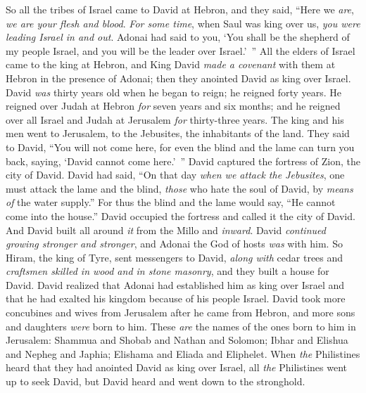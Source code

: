 \begin{biblechapter} %
 So all the tribes of Israel came to David at Hebron, and they said, “Here we \textit{are}, \textit{we are your flesh and blood}.
\verse \textit{For some time}, when Saul was king over us, \textit{you were leading Israel in and out}. Adonai had said to you, ‘You shall be the shepherd of my people Israel, and you will be the leader over Israel.’ ”
\verse All the elders of Israel came to the king at Hebron, and King David \textit{made a covenant} with them at Hebron in the presence of Adonai; then they anointed David as king over Israel.
\verse David \textit{was} thirty years old when he began to reign; he reigned forty years.
\verse He reigned over Judah at Hebron \textit{for} seven years and six months; and he reigned over all Israel and Judah at Jerusalem \textit{for} thirty-three years.
 The king and his men went to Jerusalem, to the Jebusites, the inhabitants of the land. They said to David, “You will not come here, for even the blind and the lame can turn you back, saying, ‘David cannot come here.’ ”
\verse David captured the fortress of Zion, the city of David.
\verse David had said, “On that day \textit{when we attack the Jebusites}, one must attack the lame and the blind, \textit{those} who hate the soul of David, by \textit{means of} the water supply.” For thus the blind and the lame would say, “He cannot come into the house.”
\verse David occupied the fortress and called it the city of David. And David built all around \textit{it} from the Millo and \textit{inward}.
\verse David \textit{continued growing stronger and stronger}, and Adonai the God of hosts \textit{was} with him.
\verse So Hiram, the king of Tyre, sent messengers to David, \textit{along with} cedar trees and \textit{craftsmen skilled in wood and in stone masonry}, and they built a house for David.
\verse David realized that Adonai had established him as king over Israel and that he had exalted his kingdom because of his people Israel.
\verse David took more concubines and wives from Jerusalem after he came from Hebron, and more sons and daughters \textit{were} born to him.
\verse These \textit{are} the names of the ones born to him in Jerusalem: Shammua and Shobab and Nathan and Solomon;
\verse Ibhar and Elishua and Nepheg and Japhia;
\verse Elishama and Eliada and Eliphelet.
 When \textit{the} Philistines heard that they had anointed David as king over Israel, all \textit{the} Philistines went up to seek David, but David heard and went down to the stronghold.

\end{biblechapter}
